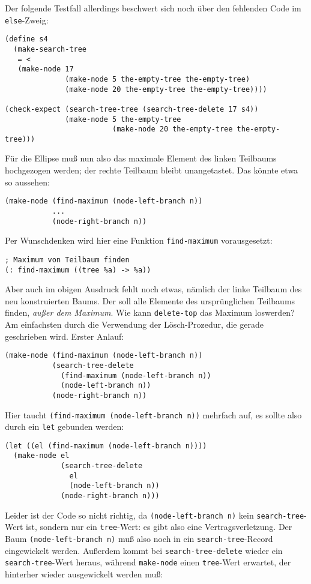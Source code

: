 Der folgende Testfall allerdings beschwert sich noch über den
fehlenden Code im \texttt{else}-Zweig:
%
\begin{verbatim}
(define s4
  (make-search-tree
   = <
   (make-node 17
              (make-node 5 the-empty-tree the-empty-tree)
              (make-node 20 the-empty-tree the-empty-tree))))

(check-expect (search-tree-tree (search-tree-delete 17 s4))
              (make-node 5 the-empty-tree
                         (make-node 20 the-empty-tree the-empty-tree)))
\end{verbatim}
%
Für die Ellipse muß nun also das maximale Element des linken Teilbaums
hochgezogen werden; der rechte Teilbaum bleibt unangetastet.  Das
könnte etwa so aussehen:
%
\begin{verbatim}
(make-node (find-maximum (node-left-branch n))
           ...
           (node-right-branch n))
\end{verbatim}
%
Per Wunschdenken wird hier eine Funktion \texttt{find-maximum}
vorausgesetzt:
%
\begin{verbatim}
; Maximum von Teilbaum finden
(: find-maximum ((tree %a) -> %a))
\end{verbatim}
%
Aber auch im obigen Ausdruck fehlt noch etwas, nämlich der linke
Teilbaum des neu konstruierten Baums.  Der soll alle Elemente des
ursprünglichen Teilbaums finden, \emph{außer dem Maximum}.  Wie kann
\texttt{delete-top} das Maximum loswerden?  Am einfachsten durch die
Verwendung der Lösch-Prozedur, die gerade geschrieben wird.  Erster
Anlauf:
%
\begin{verbatim}
(make-node (find-maximum (node-left-branch n))
           (search-tree-delete
             (find-maximum (node-left-branch n))
             (node-left-branch n))
           (node-right-branch n))
\end{verbatim}
%
Hier taucht \texttt{(find-maximum (node-left-branch n))} mehrfach auf,
es sollte also durch ein \texttt{let} gebunden werden:
%
\begin{verbatim}
(let ((el (find-maximum (node-left-branch n))))
  (make-node el
             (search-tree-delete
               el
               (node-left-branch n))
             (node-right-branch n)))
\end{verbatim}
%
Leider ist der Code so nicht richtig, da \texttt{(node-left-branch n)}
kein \texttt{search-tree}-Wert ist, sondern nur ein
\texttt{tree}-Wert: es gibt also eine Vertragsverletzung.  Der Baum
\texttt{(node-left-branch n)} muß also noch in ein
\texttt{search-tree}-Record eingewickelt werden.  Außerdem kommt bei
\texttt{search-tree-delete} wieder ein \texttt{search-tree}-Wert
heraus, während \texttt{make-node} einen \texttt{tree}-Wert erwartet,
der hinterher wieder ausgewickelt werden muß:
%

